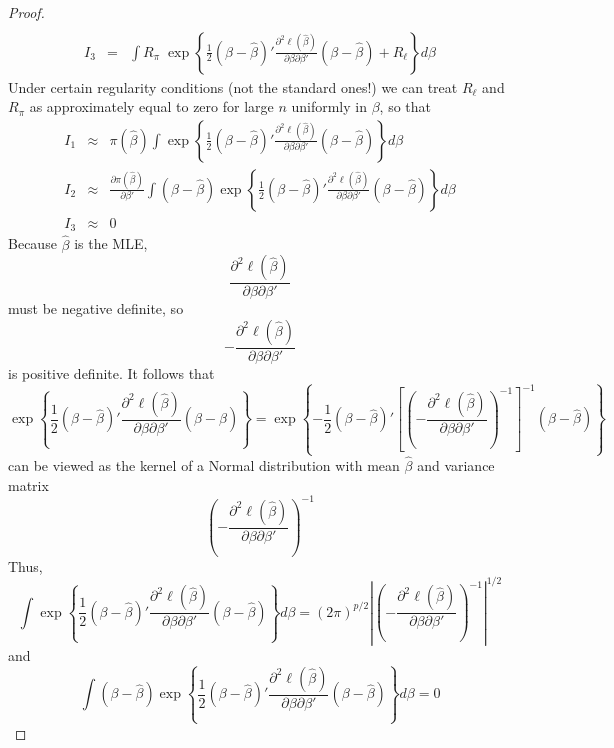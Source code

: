\documentclass[12pt]{article}
\theoremstyle{definition}
\begin{document}
\begin{proof}
\begin{eqnarray*}
\\
		I_3 &=& \int R_\pi \; \exp{\left\{ \frac{1}{2} \left( \beta - \hat{\beta}  \right)' \frac{\partial^2 \ell(\hat{\beta})}{\partial \beta \partial \beta'} \left( \beta - \hat{\beta}  \right) + R_\ell\right\}} d\beta
	\end{eqnarray*}
Under certain regularity conditions (not the standard ones!) we can treat $R_\ell$ and $R_\pi$ as approximately equal to zero for large $n$ uniformly in $\beta$, so that
	\begin{eqnarray*}
		I_1 &\approx& \pi(\hat{\beta}) \int  \exp{\left\{ \frac{1}{2} \left( \beta - \hat{\beta}  \right)' \frac{\partial^2 \ell(\hat{\beta})}{\partial \beta \partial \beta'} \left( \beta - \hat{\beta}  \right) \right\}} d\beta\\
		I_2 &\approx& \frac{\partial \pi(\hat{\beta})}{\partial \beta'}   \int  \left(\beta - \hat{\beta}  \right) \exp{\left\{ \frac{1}{2} \left( \beta - \hat{\beta}  \right)' \frac{\partial^2 \ell(\hat{\beta})}{\partial \beta \partial \beta'} \left( \beta - \hat{\beta}  \right) \right\}} d\beta\\
		I_3 &\approx& 0
	\end{eqnarray*}	
Because $\hat{\beta}$ is the MLE, 
	$$\frac{\partial^2 \ell(\hat{\beta})}{\partial \beta \partial \beta'}$$ 
must be negative definite, so 
	$$-\frac{\partial^2 \ell(\hat{\beta})}{\partial \beta \partial \beta'}$$
is positive definite. It follows that 
	$$ \exp{\left\{ \frac{1}{2} \left( \beta - \hat{\beta}  \right)' \frac{\partial^2 \ell(\hat{\beta})}{\partial \beta \partial \beta'} \left( \beta - \hat{\beta}  \right) \right\}} =  \exp{\left\{ -\frac{1}{2} \left( \beta - \hat{\beta}  \right)'\left[ \left(-\frac{\partial^2 \ell(\hat{\beta})}{\partial \beta \partial \beta'}\right)^{-1} \right]^{-1}\left( \beta - \hat{\beta}  \right) \right\}}$$
can be viewed as the kernel of a Normal distribution with mean $\hat{\beta}$ and variance matrix 
	$$\left(-\frac{\partial^2 \ell(\hat{\beta})}{\partial \beta \partial \beta'}\right)^{-1}$$
Thus,
	$$\int  \exp{\left\{ \frac{1}{2} \left( \beta - \hat{\beta}  \right)' \frac{\partial^2 \ell(\hat{\beta})}{\partial \beta \partial \beta'} \left( \beta - \hat{\beta}  \right) \right\}} d\beta = \left(2\pi\right)^{p/2}\left| \left(-\frac{\partial^2 \ell(\hat{\beta})}{\partial \beta \partial \beta'}\right)^{-1} \right|^{1/2}$$
and
	$$\int \left(\beta - \hat{\beta}  \right)  \exp{\left\{ \frac{1}{2} \left( \beta - \hat{\beta}  \right)' \frac{\partial^2 \ell(\hat{\beta})}{\partial \beta \partial \beta'} \left( \beta - \hat{\beta}  \right) \right\}} d\beta = 0$$

\end{proof}
\end{document}
